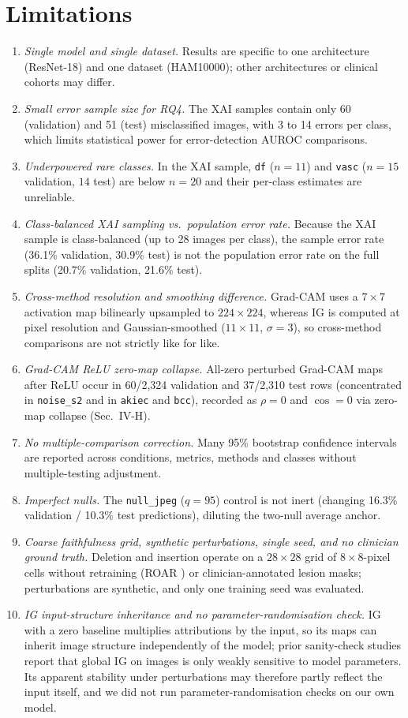 \documentclass[conference]{IEEEtran}
\begin{document}
\section{Limitations}
\begin{enumerate}
\item \emph{Single model and single dataset.} Results are specific to one
architecture (ResNet-18) and one dataset (HAM10000); other architectures or
clinical cohorts may differ.
\item \emph{Small error sample size for RQ4.} The XAI samples contain only 60
(validation) and 51 (test) misclassified images, with 3 to 14 errors per
class, which limits statistical power for error-detection AUROC comparisons.
\item \emph{Underpowered rare classes.} In the XAI sample, \texttt{df}
($n{=}11$) and \texttt{vasc} ($n{=}15$ validation, $14$ test) are below $n{=}20$
and their per-class estimates are unreliable.
\item \emph{Class-balanced XAI sampling vs.\ population error rate.} Because
the XAI sample is class-balanced (up to 28 images per class), the sample
error rate (36.1\% validation, 30.9\% test) is not the population error rate
on the full splits (20.7\% validation, 21.6\% test).
\item \emph{Cross-method resolution and smoothing difference.} Grad-CAM uses
a $7\times7$ activation map bilinearly upsampled to $224\times224$, whereas
IG is computed at pixel resolution and Gaussian-smoothed ($11\times11$,
$\sigma{=}3$), so cross-method comparisons are not strictly like for like.
\item \emph{Grad-CAM ReLU zero-map collapse.} All-zero perturbed Grad-CAM
maps after ReLU occur in 60/2,324 validation and 37/2,310 test rows
(concentrated in \texttt{noise\_s2} and in \texttt{akiec} and \texttt{bcc}),
recorded as $\rho{=}0$ and $\cos{=}0$ via zero-map collapse (Sec.~IV-H).
\item \emph{No multiple-comparison correction.} Many 95\% bootstrap
confidence intervals are reported across conditions, metrics, methods and
classes without multiple-testing adjustment.
\item \emph{Imperfect nulls.} The \texttt{null\_jpeg} ($q{=}95$) control is
not inert (changing 16.3\% validation / 10.3\% test predictions), diluting the
two-null average anchor.
\item \emph{Coarse faithfulness grid, synthetic perturbations, single seed,
and no clinician ground truth.} Deletion and insertion operate on a
$28\times28$ grid of $8\times8$-pixel cells without retraining (ROAR
\cite{hooker2019}) or clinician-annotated lesion masks; perturbations are
synthetic, and only one training seed was evaluated.
\item \emph{IG input-structure inheritance and no parameter-randomisation check.}
IG with a zero baseline multiplies attributions by the input, so its maps can
inherit image structure independently of the model; prior sanity-check
studies report that global IG on images is only weakly sensitive to model
parameters. Its apparent stability under perturbations may therefore partly
reflect the input itself, and we did not run parameter-randomisation checks
on our own model.
\end{enumerate}
\end{document}
